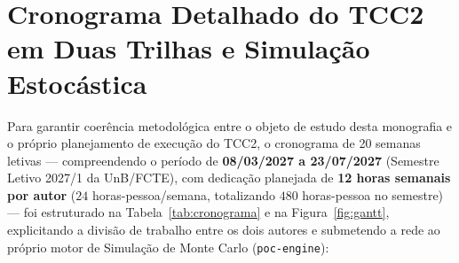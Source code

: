 \documentclass[12pt,openany,oneside,a4paper,english,brazilian,sumario=tradicional]{abntex2}
\begin{document}
\section{Cronograma Detalhado do TCC2 em Duas Trilhas e Simulação Estocástica}

Para garantir coerência metodológica entre o objeto de estudo desta monografia e o próprio planejamento de execução do TCC2, o cronograma de 20 semanas letivas — compreendendo o período de \textbf{08/03/2027 a 23/07/2027} (Semestre Letivo 2027/1 da UnB/FCTE), com dedicação planejada de \textbf{12 horas semanais por autor} ($24$ horas-pessoa/semana, totalizando $480$ horas-pessoa no semestre) — foi estruturado na Tabela~\ref{tab:cronograma} e na Figura~\ref{fig:gantt}, explicitando a divisão de trabalho entre os dois autores e submetendo a rede ao próprio motor de Simulação de Monte Carlo (\texttt{poc-engine}):
\end{document}

